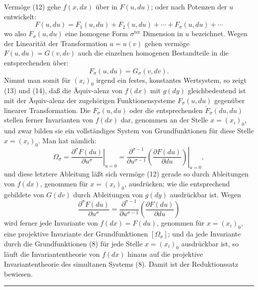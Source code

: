 \documentclass[12pt,a4paper]{article}
\begin{document}
Verm\"oge (12) gehe $f(x,dx)$ \"uber in $F(u,du)$; oder nach Potenzen der $u$ entwickelt:
\begin{equation}\tag{13}
F(u,du)=F_{1}(u,du)+F_{2}(u,du)+\cdots+F_{\sigma}(u,du)+\cdots
\end{equation}
wo also $F_{\sigma}(u,du)$ eine homogene Form $\sigma^{\mathrm{ter}}$ Dimension in $u$ bezeichnet. Wegen der Linearit\"at der Transformation $u=u(v)$ gehen verm\"oge $F(u,du)=G(v,dv)$ auch die einzelnen homogenen Bestandteile in die entsprechenden \"uber:
\begin{equation}\tag{14}
F_{\sigma}(u,du)=G_{\sigma}(v,dv).
\end{equation}
Nimmt man somit f\"ur $(x_{i})_{0}$ irgend ein festes, konstantes Wertsystem, so zeigt (13) und (14), da\ss{} die \"Aquiv-alenz von $f(dx)$ mit $g(dy)$ gleichbedeutend ist mit der \"Aquiv-alenz der zugeh\"origen Funktionensysteme $F_{\sigma}(u,du)$ gegen\"uber linearer Transformation. Die $F_{\sigma}(u,du)$ oder die entsprechenden $\tilde{F}_{\sigma}(du,du)$ stellen ferner Invarianten von $f(dx)$ dar, genommen an der Stelle $x=(x_{i})_{0}$, und zwar bilden sie ein vollst\"andiges System von Grundfunktionen f\"ur diese Stelle $x=(x_{i})_{0}$. Man hat n\"amlich:
\[
\varOmega_{\sigma}=\left.\frac{\partial^{\sigma}F(du)}{\partial u^{\sigma}}\right|_{u=0}
=\left.\frac{\partial^{\sigma-1}}{\partial u^{\sigma-1}}\left(\frac{\partial F(du)}{\partial du}\right)\right|_{u=0},
\]
und diese letztere Ableitung l\"a\ss{}t sich verm\"oge (12) gerade so durch Ableitungen von $f(dx)$, genommen f\"ur $x=(x_{i})_{0}$, ausdr\"ucken; wie die entsprechend gebildete von $G(dv)$ durch Ableitungen von $g(dy)$ ausdr\"uckbar ist. Wegen
\[
\frac{\partial^{\sigma}F(du)}{\partial u^{\sigma}}=
\frac{\partial^{\sigma-1}}{\partial u^{\sigma-1}}
\left(\frac{\partial F(du)}{\partial du}\right)
\]
wird ferner jede Invariante von $f(dx)=F(du)$, genommen f\"ur $x=(x_{i})_{0}$, eine projektive Invariante der Grundfunktionen $[\varOmega_{\sigma}]$; und da jede Invariante durch die Grundfunktionen (8) f\"ur jede Stelle $x=(x_{i})_{0}$ ausdr\"uckbar ist, so l\"auft die Invariantentheorie von $f(dx)$ hinaus auf die projektive Invariantentheorie des simultanen Systems (8). Damit ist der Reduktionssatz bewiesen.

\smallskip
\noindent\rule{0.3\textwidth}{0.4pt}
\end{document}
